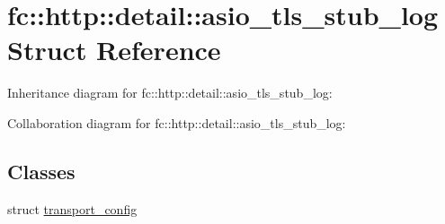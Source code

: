 \hypertarget{structfc_1_1http_1_1detail_1_1asio__tls__stub__log}{}\section{fc\+:\+:http\+:\+:detail\+:\+:asio\+\_\+tls\+\_\+stub\+\_\+log Struct Reference}
\label{structfc_1_1http_1_1detail_1_1asio__tls__stub__log}


Inheritance diagram for fc\+:\+:http\+:\+:detail\+:\+:asio\+\_\+tls\+\_\+stub\+\_\+log\+:


Collaboration diagram for fc\+:\+:http\+:\+:detail\+:\+:asio\+\_\+tls\+\_\+stub\+\_\+log\+:
\subsection*{Classes}
\begin{DoxyCompactItemize}
\item 
struct \mbox{\hyperlink{structfc_1_1http_1_1detail_1_1asio__tls__stub__log_1_1transport__config}{transport\+\_\+config}}
\end{DoxyCompactItemize}
